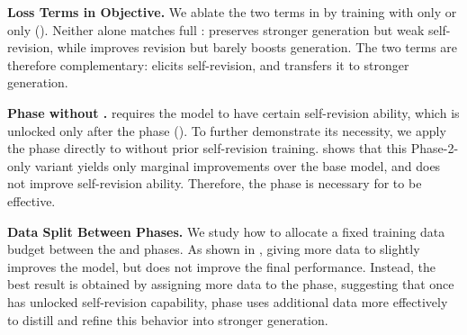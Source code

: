 \textbf{Loss Terms in \sft{} Objective.} We ablate the two terms in \lsrt{} by training with only \lgen{} or only \lrev{} (). Neither alone matches full \sft{}: \lgen{} preserves stronger generation but weak self-revision, while \lrev{} improves revision but barely boosts generation. The two terms are therefore complementary: \lrev{} elicits self-revision, and \lgen{} transfers it to stronger generation.


\textbf{\opsd{} Phase without \sft{}.} \ours{} requires the model to have certain self-revision ability, which is unlocked only after the \sft{} phase (). To further demonstrate its necessity, we apply the \opsd{} phase directly to \qwen{} without prior self-revision training.  shows that this Phase-2-only variant yields only marginal improvements over the base model, and does not improve self-revision ability. Therefore, the \sft{} phase is necessary for \ours{} to be effective.

\textbf{Data Split Between Phases.} We study how to allocate a fixed training data budget between the \sft{} and \opsd{} phases. As shown in , giving more data to \sft{} slightly improves the \sft{} model, but does not improve the final performance. Instead, the best result is obtained by assigning more data to the \opsd{} phase, suggesting that once \sft{} has unlocked self-revision capability, \opsd{} phase uses additional data more effectively to distill and refine this behavior into stronger generation.





